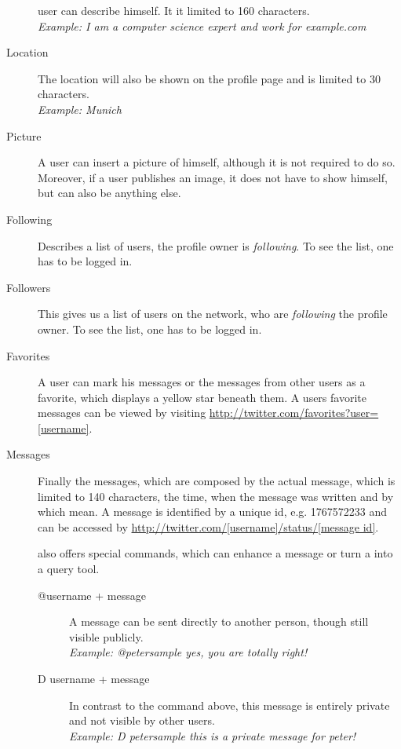 \begin{description}
                    user can describe himself. It it limited to 160
                    characters.\\
                    \textit{Example: I am a computer science expert and work
                    for example.com}
\item[Location] The location will also be shown on the profile page and is
                limited to 30 characters.\\
                \textit{Example: Munich}
\item[Picture] A user can insert a picture of himself, although it is not
               required to do so. Moreover, if a user publishes an image, it does not have to
               show himself, but can also be anything else.
\item[Following] Describes a list of users, the profile owner is \textit{following}.
                 To see the list, one has to be logged in.
\item[Followers] This gives us a list of users on the \Twitter{} network, who
                 are \textit{following} the profile owner. To see the list, one has to be logged in.
\item[Favorites] A user can mark his messages or the messages from other users as
                 a favorite, which displays a
                 yellow star beneath them. A users favorite messages can be viewed
                 by visiting \url{http://twitter.com/favorites?user=[username]}.
\item[Messages] Finally the messages, which are composed by the actual message,
                which is limited to 140 characters, the time, when the message
                was written and by which mean. A message is identified by a unique
                id, e.g. 1767572233 and can be accessed by
                \url{http://twitter.com/[username]/status/[message id]}.

                \Twitter{} also offers special commands, which can enhance a
                message or turn a \Twitter{} into a query tool.
  \begin{description}
    \item[@username + message]
      A message can be sent directly to another person, though still visible
      publicly.\\
      \textit{Example: @petersample yes, you are totally right!}

    \item[D username + message]
      In contrast to the command above, this message is entirely private and
      not visible by other users.\\
      \textit{Example: D petersample this is a private message for peter!}


\end{description}
\end{description}
